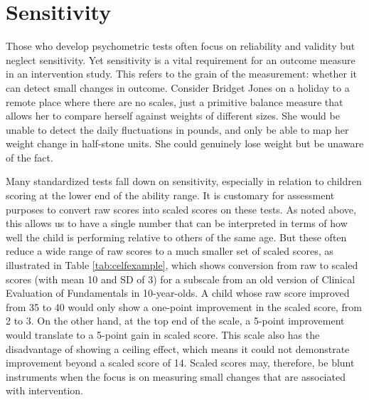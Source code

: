 \documentclass{krantz}
\begin{document}
\hypertarget{sensitivity}{%
\section{Sensitivity}\label{sensitivity}}

Those who develop psychometric tests often focus on reliability and validity but neglect sensitivity. Yet sensitivity is a vital requirement for an outcome measure in an intervention study. This refers to the grain of the measurement: whether it can detect small changes in outcome. Consider Bridget Jones on a holiday to a remote place where there are no scales, just a primitive balance measure that allows her to compare herself against weights of different sizes. She would be unable to detect the daily fluctuations in pounds, and only be able to map her weight change in half-stone units. She could genuinely lose weight but be unaware of the fact.

Many standardized tests fall down on sensitivity, especially in relation to children scoring at the lower end of the ability range. It is customary for assessment purposes to convert raw scores into scaled scores on these tests. As noted above, this allows us to have a single number that can be interpreted in terms of how well the child is performing relative to others of the same age. But these often reduce a wide range of raw scores to a much smaller set of scaled scores, as illustrated in Table \ref{tab:celfexample}, which shows conversion from raw to scaled scores (with mean 10 and SD of 3) for a subscale from an old version of Clinical Evaluation of Fundamentals in 10-year-olds. A child whose raw score improved from 35 to 40 would only show a one-point improvement in the scaled score, from 2 to 3. On the other hand, at the top end of the scale, a 5-point improvement would translate to a 5-point gain in scaled score. This scale also has the disadvantage of showing a ceiling effect, which means it could not demonstrate improvement beyond a scaled score of 14. Scaled scores may, therefore, be blunt instruments when the focus is on measuring small changes that are associated with intervention.
\end{document}
